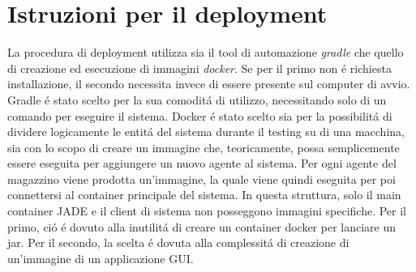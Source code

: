 \section{Istruzioni per il deployment}


La procedura di deployment utilizza sia il tool di automazione \textit{gradle} che quello di creazione ed esecuzione di immagini \textit{docker}. Se per il primo non \'e richiesta installazione, il secondo necessita invece di essere presente sul computer di avvio.\\
Gradle \'e stato scelto per la sua comodit\'a di utilizzo, necessitando solo di un comando per eseguire il sistema. Docker \'e stato scelto sia per la possibilit\'a di dividere logicamente le entit\'a del sistema durante il testing su di una macchina, sia con lo scopo di creare un immagine che, teoricamente, possa semplicemente essere eseguita per aggiungere un nuovo agente al sistema.
\parag
Per ogni agente del magazzino viene prodotta un'immagine, la quale viene quindi eseguita per poi connettersi al container principale del sistema. In questa struttura, solo il main container JADE e il client di sistema non posseggono immagini specifiche. Per il primo, ci\'o \'e dovuto alla inutilit\'a di creare un container docker per lanciare un jar. Per il secondo, la scelta \'e dovuta alla complessit\'a di creazione di un'immagine di un applicazione GUI.
